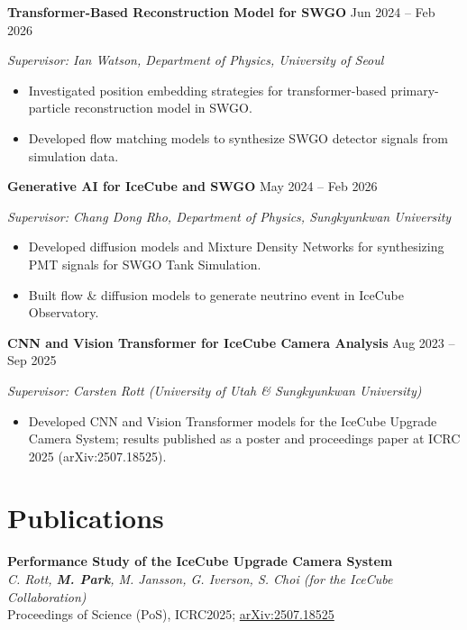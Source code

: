 \documentclass[11pt, a4paper]{article}
\newcommand{\experienceitem}[4]{
    \begin{tcolorbox}[
        colback=lightgray,
        colframe=primary,
        boxrule=0pt,
        leftrule=3pt,
        arc=0pt,
        left=5pt,
        right=5pt,
        top=5pt,
        bottom=5pt
    ]
    \textbf{\large #1} \hfill {\color{primary}#2}

    \textit{#3}

    #4
    \end{tcolorbox}
    \vspace{3pt}
}
\begin{document}
\experienceitem{Transformer-Based Reconstruction Model for SWGO}{Jun 2024 -- Feb 2026}{Supervisor: Ian Watson, Department of Physics, University of Seoul}{
    \begin{itemize}[leftmargin=*, itemsep=2pt]
        \item Investigated position embedding strategies for transformer-based primary-particle reconstruction model in SWGO.
        \item Developed flow matching models to synthesize SWGO detector signals from simulation data.
    \end{itemize}
}

\experienceitem{Generative AI for IceCube and SWGO}{May 2024 -- Feb 2026}{Supervisor: Chang Dong Rho, Department of Physics, Sungkyunkwan University}{
    \begin{itemize}[leftmargin=*, itemsep=2pt]
        \item Developed diffusion models and Mixture Density Networks for synthesizing PMT signals for SWGO Tank Simulation.
        \item Built flow \& diffusion models to generate neutrino event in IceCube Observatory.
    \end{itemize}
}

\experienceitem{CNN and Vision Transformer for IceCube Camera Analysis}{Aug 2023 -- Sep 2025}{Supervisor: Carsten Rott (University of Utah \& Sungkyunkwan University)}{
    \begin{itemize}[leftmargin=*, itemsep=2pt]
        \item Developed CNN and Vision Transformer models for the IceCube Upgrade Camera System; results published as a poster and proceedings paper at ICRC 2025 (arXiv:2507.18525).
    \end{itemize}
}

\section{Publications}

\newcommand{\publication}[3]{
    \vspace{4pt}
    \noindent
    \textbf{#1} \\
    \textit{#2} \\
    {\small #3}
    \vspace{6pt}
}

\publication{Performance Study of the IceCube Upgrade Camera System}
{C. Rott, \textbf{\textit{M. Park}}, M. Jansson, G. Iverson, S. Choi (for the IceCube Collaboration)}
{Proceedings of Science (PoS), ICRC2025; \href{https://arxiv.org/abs/2507.18525}{arXiv:2507.18525}}
\end{document}
